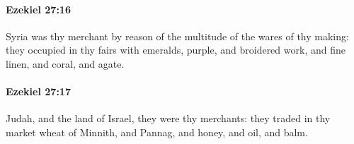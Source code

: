 		\paragraph{Ezekiel 27:16} %
			\label{EZEKIEL-27-16}

			Syria was thy merchant by reason of the multitude of the wares of thy making: they occupied in thy fairs with emeralds, purple, and broidered work, and fine linen, and coral, and agate.


		\paragraph{Ezekiel 27:17} %
			\label{EZEKIEL-27-17}

			Judah, and the land of Israel, they were thy merchants: they traded in thy market wheat of Minnith, and Pannag, and honey, and oil, and balm.


